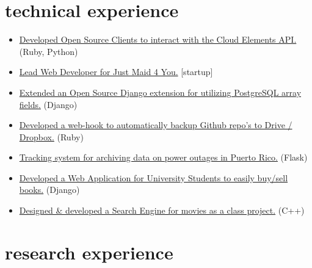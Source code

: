 \documentclass[]{friggeri-cv}
\begin{document}

\section{technical experience}

\begin{itemize}
\item \href{http://www.cloud-elements.com/developer/}{Developed Open Source Clients to interact with the Cloud Elements API.} (Ruby, Python)
\item {\href{http://www.justmaid4you.com/}{Lead Web Developer for Just Maid 4 You.}} [startup]
\item \href{https://github.com/chrisrodz/djorm-ext-pgarray}{Extended an Open Source Django extension for utilizing PostgreSQL array fields.} (Django)
\item \href{https://github.com/chrisrodz/gh-backups}{Developed a web-hook to automatically backup Github repo's to Drive / Dropbox.} (Ruby)
\item \href{http://prepa-down.com/}{Tracking system for archiving data on power outages in Puerto Rico.} (Flask)
\item \href{https://github.com/chrisrodz/libros-online}{Developed a Web Application for University Students to easily buy/sell books.} (Django)
\item \href{https://github.com/chrisrodz/moviedb-search-engine}{Designed \& developed a Search Engine for movies as a class project.} (C++)
\end{itemize}


\section{research experience}
\end{document}
